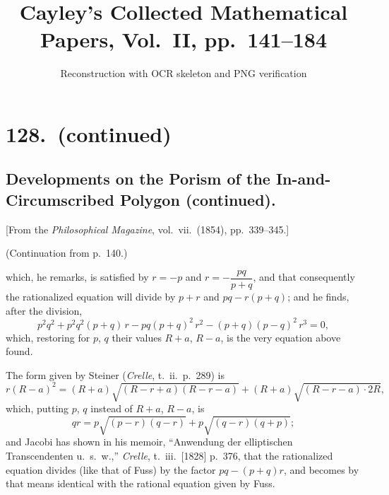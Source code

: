 \documentclass[11pt,a4paper]{article}
\title{Cayley's Collected Mathematical Papers, Vol.~II, pp.\ 141--184}
\author{Reconstruction with OCR skeleton and PNG verification}
\date{}
\begin{document}
\maketitle

\section*{128.\ (continued)}
\subsection*{Developments on the Porism of the In-and-Circumscribed Polygon (continued).}

[From the \textit{Philosophical Magazine}, vol.\ vii.\ (1854), pp.\ 339--345.]

\medskip

\noindent (Continuation from p.~140.)

\medskip

which, he remarks, is satisfied by $r = -p$ and $r = -\dfrac{pq}{p+q}$, and that consequently the rationalized equation will divide by $p+r$ and $pq - r(p+q)$; and he finds, after the division,
\[
p^2 q^2 + p^2 q^2 (p+q)\, r - pq (p+q)^2\, r^2 - (p+q)(p-q)^2\, r^3 = 0,
\]
which, restoring for $p$, $q$ their values $R+a$, $R-a$, is the very equation above found.

\medskip

The form given by Steiner (\textit{Crelle}, t.\ ii.\ p.\ 289) is
\[
r(R-a)^2 = (R+a)\sqrt{(R-r+a)(R-r-a)} + (R+a)\sqrt{(R-r-a)\cdot 2R},
\]
which, putting $p$, $q$ instead of $R+a$, $R-a$, is
\[
qr = p\sqrt{(p-r)(q-r)} + p\sqrt{(q-r)(q+p)};
\]
and Jacobi has shown in his memoir, ``Anwendung der elliptischen Transcendenten u.\ s.\ w.,'' \textit{Crelle}, t.\ iii.\ [1828] p.\ 376, that the rationalized equation divides (like that of Fuss) by the factor $pq - (p+q)r$, and becomes by that means identical with the rational equation given by Fuss.

\medskip
\end{document}
